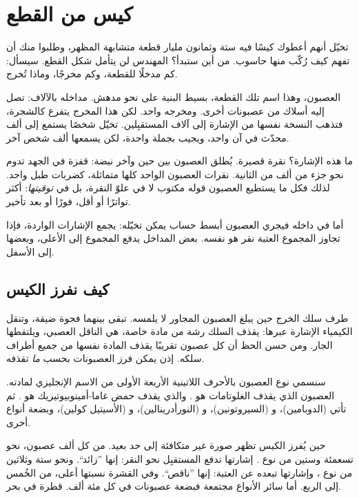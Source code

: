 \chapter{كيس من القطع}


تخيّل أنهم أعطوك كيسًا فيه ستة وثمانون مليار قطعة متشابهة المظهر، وطلبوا منك أن تفهم كيف رُكّب منها حاسوب. من أين ستبدأ؟ المهندس لن يتأمل شكل القطع. سيسأل: كم مدخلًا للقطعة، وكم مخرجًا، وماذا تُخرج.

العصبون، وهذا اسم تلك القطعة، بسيط البنية على نحو مدهش. مداخله بالآلاف: تصل إليه أسلاك من عصبونات أخرى. ومخرجه واحد. لكن هذا المخرج يتفرع كالشجرة، فتذهب النسخة نفسها من الإشارة إلى آلاف المستقبِلين. تخيّل شخصًا يستمع إلى ألف محدّث في آن واحد، ويجيب بجملة واحدة، لكن يسمعها ألف شخص آخر.

ما هذه الإشارة؟ نقرة قصيرة. يُطلق العصبون بين حين وآخر نبضة: قفزة في الجهد تدوم نحو جزء من ألف من الثانية. نقرات العصبون الواحد كلها متماثلة، كضربات طبل واحد. لذلك فكل ما يستطيع العصبون قوله مكتوب لا في علوّ النقرة، بل في \emph{توقيتها}: أكثر تواترًا أو أقل، فورًا أو بعد تأخير.

أما في داخله فيجري العصبون أبسط حساب يمكن تخيّله: يجمع الإشارات الواردة، فإذا تجاوز المجموع العتبة نقر هو نفسه. بعض المداخل يدفع المجموع إلى الأعلى، وبعضها إلى الأسفل.

\section*{كيف نفرز الكيس}

طرف سلك الخرج حين يبلغ العصبون المجاور لا يلمسه. تبقى بينهما فجوة ضيقة، وتنقل الكيمياء الإشارة عبرها: يقذف السلك رشة من مادة خاصة، هي الناقل العصبي، ويلتقطها الجار. ومن حسن الحظ أن كل عصبون تقريبًا يقذف المادة نفسها من جميع أطراف سلكه. إذن يمكن فرز العصبونات بحسب \emph{ما} تقذفه.

سنسمي نوع العصبون بالأحرف اللاتينية الأربعة الأولى من الاسم الإنجليزي لمادته. العصبون الذي يقذف الغلوتامات هو . والذي يقذف حمض غاما-أمينوبيوتيريك هو . ثم تأتي  (الدوبامين)، و (السيروتونين)، و (النورأدرينالين)، و (الأسيتيل كولين)، وبضعة أنواع أخرى.

حين يُفرز الكيس تظهر صورة غير متكافئة إلى حد بعيد. من كل ألف عصبون، نحو تسعمئة وستين من نوع . إشارتها تدفع المستقبِل نحو النقر: إنها ”زائد“. ونحو ستة وثلاثين من نوع ، وإشارتها تبعده عن العتبة: إنها ”ناقص“. وفي القشرة نسبتها أعلى، من الخُمس إلى الربع. أما سائر الأنواع مجتمعة فبضعة عصبونات في كل مئة ألف. قطرة في بحر.

